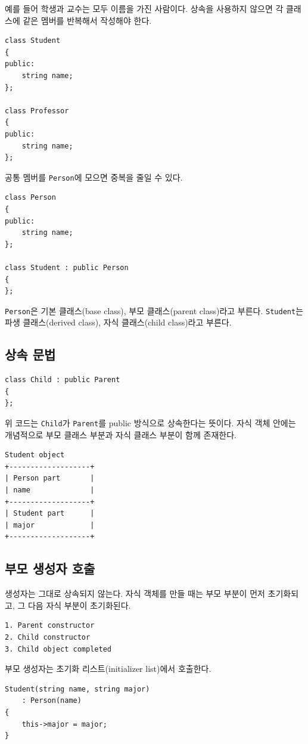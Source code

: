 \documentclass[11pt,a4paper]{article}
\begin{document}
예를 들어 학생과 교수는 모두 이름을 가진 사람이다. 상속을 사용하지 않으면 각 클래스에 같은 멤버를 반복해서 작성해야 한다.

\begin{lstlisting}
class Student
{
public:
    string name;
};

class Professor
{
public:
    string name;
};
\end{lstlisting}

공통 멤버를 \texttt{Person}에 모으면 중복을 줄일 수 있다.

\begin{lstlisting}
class Person
{
public:
    string name;
};

class Student : public Person
{
};
\end{lstlisting}

\texttt{Person}은 기본 클래스(base class), 부모 클래스(parent class)라고 부른다. \texttt{Student}는 파생 클래스(derived class), 자식 클래스(child class)라고 부른다.

\subsection{상속 문법}
\begin{lstlisting}
class Child : public Parent
{
};
\end{lstlisting}

위 코드는 \texttt{Child}가 \texttt{Parent}를 public 방식으로 상속한다는 뜻이다. 자식 객체 안에는 개념적으로 부모 클래스 부분과 자식 클래스 부분이 함께 존재한다.

\begin{verbatim}
Student object
+-------------------+
| Person part       |
| name              |
+-------------------+
| Student part      |
| major             |
+-------------------+
\end{verbatim}

\subsection{부모 생성자 호출}
생성자는 그대로 상속되지 않는다. 자식 객체를 만들 때는 부모 부분이 먼저 초기화되고, 그 다음 자식 부분이 초기화된다.

\begin{verbatim}
1. Parent constructor
2. Child constructor
3. Child object completed
\end{verbatim}

부모 생성자는 초기화 리스트(initializer list)에서 호출한다.

\begin{lstlisting}
Student(string name, string major)
    : Person(name)
{
    this->major = major;
}
\end{lstlisting}
\end{document}
